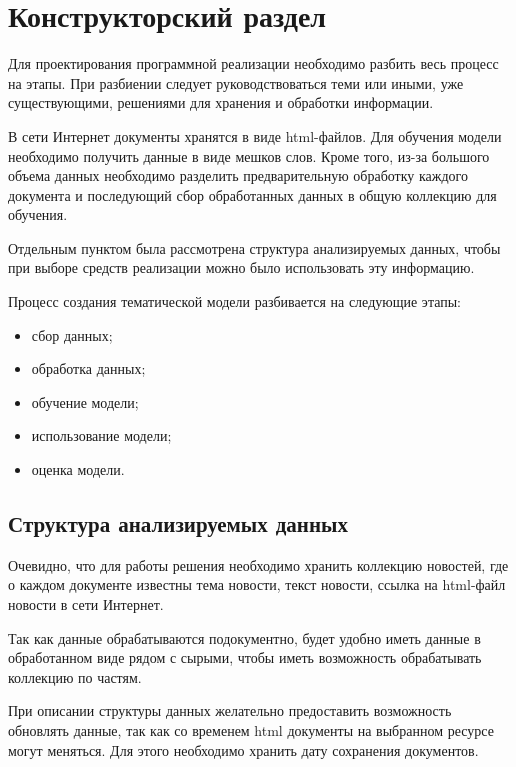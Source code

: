 \chapter{Конструкторский раздел}

Для проектирования программной реализации необходимо разбить весь процесс на этапы. При разбиении следует руководствоваться теми или иными, уже существующими, решениями для хранения и обработки информации.

В сети Интернет документы хранятся в виде html-файлов.
Для обучения модели необходимо получить данные в виде мешков слов.
Кроме того, из-за большого объема данных необходимо разделить предварительную обработку каждого документа и последующий сбор обработанных данных в общую коллекцию для обучения.

Отдельным пунктом была рассмотрена структура анализируемых данных, чтобы при выборе средств реализации можно было использовать эту информацию. 

Процесс создания тематической модели разбивается на следующие этапы:

\begin{itemize}
    \item сбор данных;
    \item обработка данных;
    \item обучение модели;
    \item использование модели;
    \item оценка модели.
\end{itemize}


%
\section{Структура анализируемых данных}


Очевидно, что для работы решения необходимо хранить коллекцию новостей, где о каждом документе известны тема новости, текст новости, ссылка на html-файл новости в сети Интернет.

Так как данные обрабатываются подокументно, будет удобно иметь данные в обработанном виде рядом с сырыми, чтобы иметь возможность обрабатывать коллекцию по частям.

При описании структуры данных желательно предоставить возможность обновлять данные, так как со временем html документы на выбранном ресурсе могут меняться. Для этого необходимо хранить дату сохранения документов.

